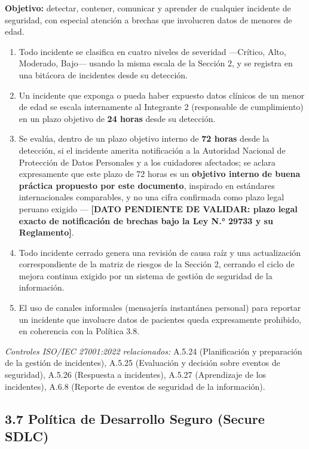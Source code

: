 \documentclass[11pt,a4paper]{article}
\providecommand{\tightlist}{%
  \setlength{\itemsep}{0pt}\setlength{\parskip}{0pt}}
\begin{document}
\textbf{Objetivo:} detectar, contener, comunicar y aprender de cualquier incidente de seguridad, con especial atención a brechas que involucren datos de menores de edad.

\begin{enumerate}
\def\labelenumi{\arabic{enumi}.}
\tightlist
\item
  Todo incidente se clasifica en cuatro niveles de severidad ---Crítico, Alto, Moderado, Bajo--- usando la misma escala de la Sección 2, y se registra en una bitácora de incidentes desde su detección.
\item
  Un incidente que exponga o pueda haber expuesto datos clínicos de un menor de edad se escala internamente al Integrante 2 (responsable de cumplimiento) en un plazo objetivo de \textbf{24 horas} desde su detección.
\item
  Se evalúa, dentro de un plazo objetivo interno de \textbf{72 horas} desde la detección, si el incidente amerita notificación a la Autoridad Nacional de Protección de Datos Personales y a los cuidadores afectados; se aclara expresamente que este plazo de 72 horas es un \textbf{objetivo interno de buena práctica propuesto por este documento}, inspirado en estándares internacionales comparables, y no una cifra confirmada como plazo legal peruano exigido --- \textbf{{[}DATO PENDIENTE DE VALIDAR: plazo legal exacto de notificación de brechas bajo la Ley N.° 29733 y su Reglamento{]}}.
\item
  Todo incidente cerrado genera una revisión de causa raíz y una actualización correspondiente de la matriz de riesgos de la Sección 2, cerrando el ciclo de mejora continua exigido por un sistema de gestión de seguridad de la información.
\item
  El uso de canales informales (mensajería instantánea personal) para reportar un incidente que involucre datos de pacientes queda expresamente prohibido, en coherencia con la Política 3.8.
\end{enumerate}

\emph{Controles ISO/IEC 27001:2022 relacionados:} A.5.24 (Planificación y preparación de la gestión de incidentes), A.5.25 (Evaluación y decisión sobre eventos de seguridad), A.5.26 (Respuesta a incidentes), A.5.27 (Aprendizaje de los incidentes), A.6.8 (Reporte de eventos de seguridad de la información).

\subsection{3.7 Política de Desarrollo Seguro (Secure SDLC)}\label{poluxedtica-de-desarrollo-seguro-secure-sdlc}
\end{document}
